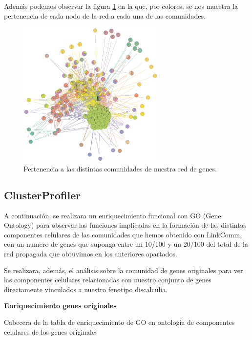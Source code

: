 Además podemos observar la figura \ref{fig:LinkComm3} en la que, por colores, se nos muestra la pertenencia de cada nodo de la red a cada una de las comunidades.

\begin{figure}[h]
	\centering
	\includegraphics[width=0.65\textwidth]{figures/Grafo_Linkcomm.PNG}
	\caption{Pertenencia a las distintas comunidades de nuestra red de genes. }
	\label{fig:LinkComm3}
\end{figure}

\newpage

\subsection{ClusterProfiler}

\hfill

A continuación, se realizara un enriquecimiento funcional con GO (Gene Ontology) para observar las funciones implicadas en la formación de las distintas componentes celulares de las comunidades que hemos obtenido con LinkComm, con un numero de genes que suponga entre un 10/100 y un 20/100 del total de la red propagada que obtuvimos en los anteriores apartados.

\hfill

Se realizara, además, el análisis sobre la comunidad de genes originales para ver las componentes celulares relacionadas con nuestro conjunto de genes directamente vinculados a nuestro fenotipo discalculia.

\hfill


\textbf{Enriquecimiento genes originales}

  Cabecera de la tabla de enriquecimiento de GO en ontología de componentes celulares de los genes originales 

